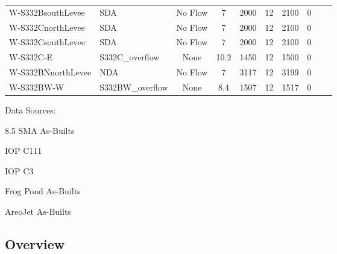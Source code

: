 \begin{table}[!h]
\begin{tabular}{llcccccccc}
W-S332BsouthLevee & SDA              & No Flow   &  7      & 2000    & 12    & 2100  & 0     &           &            \\
W-S332CnorthLevee & SDA              & No Flow   &  7      & 2000    & 12    & 2100  & 0     &           &            \\
W-S332CsouthLevee & SDA              & No Flow   &  7      & 2000    & 12    & 2100  & 0     &           &            \\
W-S332C-E         & S332C\_overflow  & None      &  10.2   & 1450    & 12    & 1500  & 0     &           &            \\
W-S332BNnorthLevee& NDA              & No Flow   &  7      & 3117    & 12    & 3199  & 0     &           &            \\
W-S332BW-W        & S332BW\_overflow & None      &  8.4    & 1507    & 12    & 1517  & 0     &           &            \\
\hline
\end{tabular}
Data Sources:

8.5 SMA As-Builts

IOP C111

IOP C3

Frog Pond As-Builts

AreoJet As-Builts

\end{table}



\subsection{Overview}

\cleardoublepage

